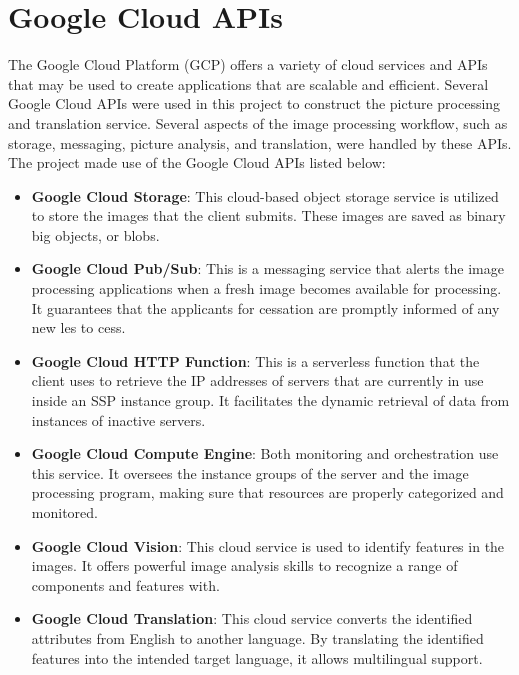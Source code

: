 \chapter{Google Cloud APIs}\label{ch:google_cloud_apis}

The Google Cloud Platform (GCP) offers a variety of cloud services and APIs that may be used to create applications that are scalable and efficient. Several Google Cloud APIs were used in this project to construct the picture processing and translation service. Several aspects of the image processing workflow, such as storage, messaging, picture analysis, and translation, were handled by these APIs. The project made use of the Google Cloud APIs listed below:

\begin{itemize}
    \item \textbf{Google Cloud Storage}: This cloud-based object storage service is utilized to store the images that the client submits. These images are saved as binary big objects, or blobs.
    \item \textbf{Google Cloud Pub/Sub}: This is a messaging service that alerts the image processing applications when a fresh image becomes available for processing. It guarantees that the applicants for cessation are promptly informed of any new les to cess.
    \item \textbf{Google Cloud HTTP Function}: This is a serverless function that the client uses to retrieve the IP addresses of servers that are currently in use inside an SSP instance group. It facilitates the dynamic retrieval of data from instances of inactive servers.
    \item \textbf{Google Cloud Compute Engine}: Both monitoring and orchestration use this service. It oversees the instance groups of the server and the image processing program, making sure that resources are properly categorized and monitored.
    \item \textbf{Google Cloud Vision}: This cloud service is used to identify features in the images. It offers powerful image analysis skills to recognize a range of components and features with.
    \item \textbf{Google Cloud Translation}: This cloud service converts the identified attributes from English to another language. By translating the identified features into the intended target language, it allows multilingual support.
\end{itemize}